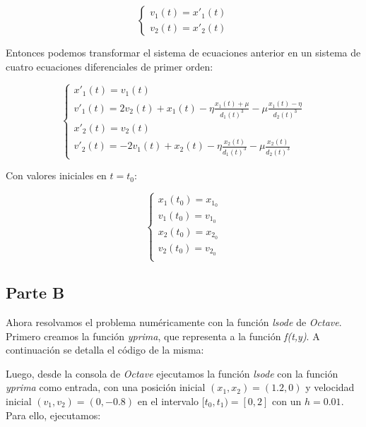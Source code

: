 \documentclass[titlepage,a4paper]{article}
\begin{document}
		\begin{equation}
			\begin{cases}
				v_{1}(t) = x'_{1}(t)\\
				v_{2}(t) = x'_{2}(t)
			\end{cases}
		\end{equation}

		Entonces podemos transformar el sistema de ecuaciones anterior en un sistema de cuatro ecuaciones 
		diferenciales de primer orden:

		\begin{equation}
			\begin{cases}
				x'_{1}(t) = v_{1}(t)\\
				v'_{1}(t) = 2v_{2}(t) + x_{1}(t) - \eta\frac{x_{1}(t) + \mu}{d_{1}(t)^{3}} - \mu\frac{x_{1}(t) - \eta}{d_{2}(t)^{3}}\\
				x'_{2}(t) = v_{2}(t)\\				
				v'_{2}(t) = -2v_{1}(t) + x_{2}(t) - \eta\frac{x_{2}(t)}{d_{1}(t)^{3}} - \mu\frac{x_{2}(t)}{d_{2}(t)^{3}}
			\end{cases}
		\end{equation}

		Con valores iniciales en $t=t_{0}$:

		\begin{equation}
			\begin{cases}
				x_{1}(t_{0}) = x_{1_{0}}\\
				v_{1}(t_{0}) = v_{1_{0}}\\
				x_{2}(t_{0}) = x_{2_{0}}\\				
				v_{2}(t_{0}) = v_{2_{0}}\\
			\end{cases}
		\end{equation}

	\subsection{Parte B}\label{sec:parteB}
		Ahora resolvamos el problema numéricamente con la función \emph{lsode} de \emph{Octave}.		
		Primero creamos la función \emph{yprima}, que representa a la función \emph{f(t,y)}.
		A continuación se detalla el código de la misma:

		

		Luego, desde la consola de \emph{Octave} ejecutamos la función \emph{lsode} con la función 
		\emph{yprima} como entrada, con una posición inicial $(x_{1}, x_{2}) = (1.2, 0)$ y velocidad inicial 
		$(v_{1}, v_{2}) = (0, -0.8)$ en el intervalo $[t_{0}, t_{1}) = [0, 2]$ con un $h=0.01$.
		Para ello, ejecutamos:
\end{document}
